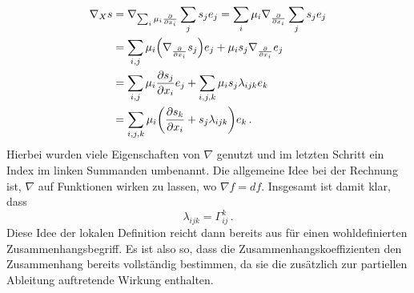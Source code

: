 \documentclass[../H_Analysis_main.tex]{subfiles}
\begin{document}
\begin{align}
\nabla_X s &= \nabla_{\sum_i \mu_i \pdv{x_i}} \sum_j s_j e_j = \sum_i \mu_i \nabla_{\pdv{x_i}} \sum_j s_j e_j
\notag\\
&= \sum_{i, j} \mu_i \qty(\nabla_{\pdv{x_i}} s_j) e_j + \mu_i s_j \nabla_{\pdv{x_i}} e_j
\notag\\
&= \sum_{i, j} \mu_i \pdv{s_j}{x_i} e_j + \sum_{i, j, k} \mu_i s_j \lambda_{ijk} e_k
\notag\\
&= \sum_{i, j, k} \mu_i \qty(\pdv{s_k}{x_i} + s_j \lambda_{ijk}) e_k \, .
\end{align}
Hierbei wurden viele Eigenschaften von $\nabla$ genutzt und im letzten Schritt ein Index im linken Summanden umbenannt. Die allgemeine Idee bei der Rechnung ist, $\nabla$ auf Funktionen wirken zu lassen, wo $\nabla f = df$. Insgesamt ist damit klar, dass
\begin{equation}
\lambda_{ijk} = \Gamma_{ij}^k \, .
\end{equation}
Diese Idee der lokalen Definition reicht dann bereits aus für einen wohldefinierten Zusammenhangsbegriff. Es ist also so, dass die Zusammenhangskoeffizienten den Zusammenhang bereits vollständig bestimmen, da sie die zusätzlich zur partiellen Ableitung auftretende Wirkung enthalten.
\end{document}
